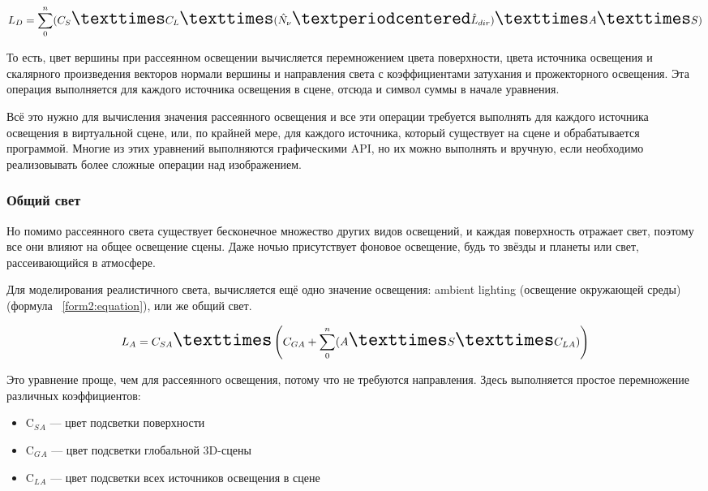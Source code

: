 \begin{equation}
	\fontsize{17}{20}{L_{D} = \sum_{0}^{n}(C_{S} × C_{L} × (\hat{N}_{\nu} · \hat{L}_{dir}) × A × S)}
	\label{form1:equation}
\end{equation}

То есть, цвет вершины при рассеянном освещении вычисляется перемножением цвета поверхности, цвета источника освещения и скалярного произведения векторов нормали вершины и направления света с коэффициентами затухания и прожекторного освещения. Эта операция выполняется для каждого источника освещения в сцене, отсюда и символ суммы в начале уравнения.

Всё это нужно для вычисления значения рассеянного освещения и все эти операции требуется выполнять для каждого источника освещения в виртуальной сцене, или, по крайней мере, для каждого источника, который существует на сцене и обрабатывается программой. Многие из этих уравнений выполняются графическими API, но их можно выполнять и вручную, если необходимо реализовывать более сложные операции над изображением.

\subsubsection{Общий свет}

Но помимо рассеянного света существует бесконечное множество других видов освещений, и каждая поверхность отражает свет, поэтому все они влияют на общее освещение сцены. Даже ночью присутствует фоновое освещение, будь то звёзды и планеты или свет, рассеивающийся в атмосфере.

Для моделирования реалистичного света, вычисляется ещё одно значение освещения: ambient lighting  (освещение окружающей среды) (формула ~\ref{form2:equation}), или же общий свет.

\begin{equation}
	\fontsize{17}{20}{L_{A} = C_{SA} × \left(C_{GA} + \sum_{0}^{n}(A × S × C_{LA})\right)}
	\label{form2:equation}
\end{equation}

Это уравнение проще, чем для рассеянного освещения, потому что не требуются направления. Здесь выполняется простое перемножение различных коэффициентов:

\begin{itemize}
	\item C$_S$$_A$ — цвет подсветки поверхности
	\item C$_G$$_A$ — цвет подсветки глобальной 3D-сцены
	\item C$_L$$_A$ — цвет подсветки всех источников освещения в сцене
\end{itemize}

